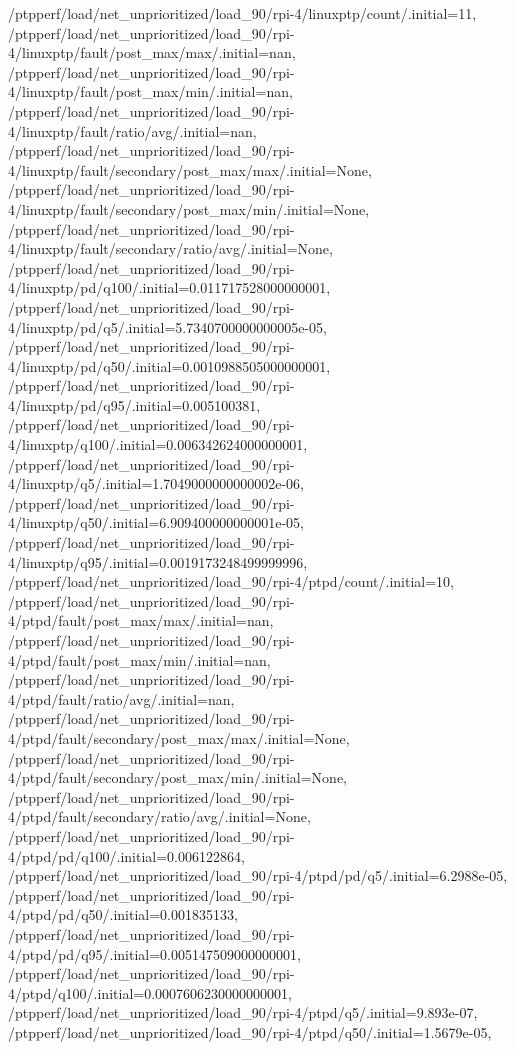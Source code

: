 {    /ptpperf/load/net_unprioritized/load_90/rpi-4/linuxptp/count/.initial=11,
    /ptpperf/load/net_unprioritized/load_90/rpi-4/linuxptp/fault/post_max/max/.initial=nan,
    /ptpperf/load/net_unprioritized/load_90/rpi-4/linuxptp/fault/post_max/min/.initial=nan,
    /ptpperf/load/net_unprioritized/load_90/rpi-4/linuxptp/fault/ratio/avg/.initial=nan,
    /ptpperf/load/net_unprioritized/load_90/rpi-4/linuxptp/fault/secondary/post_max/max/.initial=None,
    /ptpperf/load/net_unprioritized/load_90/rpi-4/linuxptp/fault/secondary/post_max/min/.initial=None,
    /ptpperf/load/net_unprioritized/load_90/rpi-4/linuxptp/fault/secondary/ratio/avg/.initial=None,
    /ptpperf/load/net_unprioritized/load_90/rpi-4/linuxptp/pd/q100/.initial=0.011717528000000001,
    /ptpperf/load/net_unprioritized/load_90/rpi-4/linuxptp/pd/q5/.initial=5.7340700000000005e-05,
    /ptpperf/load/net_unprioritized/load_90/rpi-4/linuxptp/pd/q50/.initial=0.0010988505000000001,
    /ptpperf/load/net_unprioritized/load_90/rpi-4/linuxptp/pd/q95/.initial=0.005100381,
    /ptpperf/load/net_unprioritized/load_90/rpi-4/linuxptp/q100/.initial=0.006342624000000001,
    /ptpperf/load/net_unprioritized/load_90/rpi-4/linuxptp/q5/.initial=1.7049000000000002e-06,
    /ptpperf/load/net_unprioritized/load_90/rpi-4/linuxptp/q50/.initial=6.909400000000001e-05,
    /ptpperf/load/net_unprioritized/load_90/rpi-4/linuxptp/q95/.initial=0.0019173248499999996,
    /ptpperf/load/net_unprioritized/load_90/rpi-4/ptpd/count/.initial=10,
    /ptpperf/load/net_unprioritized/load_90/rpi-4/ptpd/fault/post_max/max/.initial=nan,
    /ptpperf/load/net_unprioritized/load_90/rpi-4/ptpd/fault/post_max/min/.initial=nan,
    /ptpperf/load/net_unprioritized/load_90/rpi-4/ptpd/fault/ratio/avg/.initial=nan,
    /ptpperf/load/net_unprioritized/load_90/rpi-4/ptpd/fault/secondary/post_max/max/.initial=None,
    /ptpperf/load/net_unprioritized/load_90/rpi-4/ptpd/fault/secondary/post_max/min/.initial=None,
    /ptpperf/load/net_unprioritized/load_90/rpi-4/ptpd/fault/secondary/ratio/avg/.initial=None,
    /ptpperf/load/net_unprioritized/load_90/rpi-4/ptpd/pd/q100/.initial=0.006122864,
    /ptpperf/load/net_unprioritized/load_90/rpi-4/ptpd/pd/q5/.initial=6.2988e-05,
    /ptpperf/load/net_unprioritized/load_90/rpi-4/ptpd/pd/q50/.initial=0.001835133,
    /ptpperf/load/net_unprioritized/load_90/rpi-4/ptpd/pd/q95/.initial=0.005147509000000001,
    /ptpperf/load/net_unprioritized/load_90/rpi-4/ptpd/q100/.initial=0.0007606230000000001,
    /ptpperf/load/net_unprioritized/load_90/rpi-4/ptpd/q5/.initial=9.893e-07,
    /ptpperf/load/net_unprioritized/load_90/rpi-4/ptpd/q50/.initial=1.5679e-05,
}
